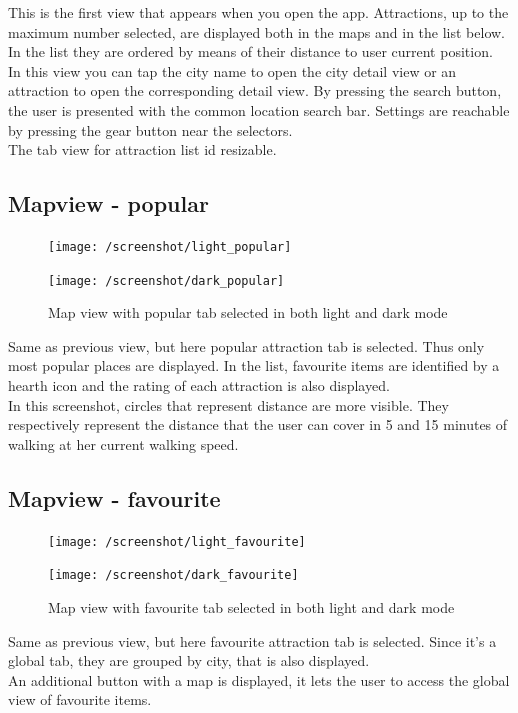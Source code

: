 \documentclass[a4paper, 11pt, parskip=half]{scrreprt}
\theoremstyle{definition}
\begin{document}
This is the first view that appears when you open the app. Attractions, up to the maximum number selected, are displayed both in the maps and in the list below. In the list they are ordered by means of their distance to user current position.
\\In this view you can tap the city name to open the city detail view or an attraction to open the corresponding detail view. By pressing the search button, the user is presented with the common location search bar. Settings are reachable by pressing the gear button near the selectors.
\\The tab view for attraction list id resizable.

\subsection{Mapview - popular}
\begin{figure}[H]
	\centering
	\begin{minipage}{.5\textwidth}
  	\centering
  	\texttt{[image: /screenshot/light\_popular]}
  	\label{fig:test1}
	\end{minipage}%
	\begin{minipage}{.5\textwidth}
  	\centering
  	\texttt{[image: /screenshot/dark\_popular]}
  	\label{fig:test2}
	\end{minipage}
	\caption{Map view with popular tab selected in both light and dark mode}
\end{figure}
Same as previous view, but here popular attraction tab is selected. Thus only most popular places are displayed. In the list, favourite items are identified by a hearth icon and the rating of each attraction is also displayed.
\\In this screenshot, circles that represent distance are more visible. They respectively represent the distance that the user can cover in 5 and 15 minutes of walking at her current walking speed.

\subsection{Mapview - favourite}
\begin{figure}[H]
	\centering
	\begin{minipage}{.5\textwidth}
  	\centering
  	\texttt{[image: /screenshot/light\_favourite]}
  	\label{fig:test1}
	\end{minipage}%
	\begin{minipage}{.5\textwidth}
  	\centering
  	\texttt{[image: /screenshot/dark\_favourite]}
  	\label{fig:test2}
	\end{minipage}
	\caption{Map view with favourite tab selected in both light and dark mode}
\end{figure}
Same as previous view, but here favourite attraction tab is selected. Since it's a global tab, they are grouped by city, that is also displayed. 
\\An additional button with a map is displayed, it lets the user to access the global view of favourite items.
\end{document}
